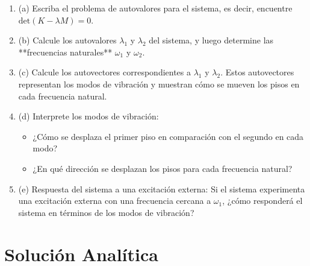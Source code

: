 \documentclass{article}
\begin{document}
\begin{enumerate}
    \item (a) Escriba el problema de autovalores para el sistema, es decir, encuentre \(\text{det}(K - \lambda M) = 0\).
    
    \item (b) Calcule los autovalores \(\lambda_1\) y \(\lambda_2\) del sistema, y luego determine las **frecuencias naturales** \(\omega_1\) y \(\omega_2\).

    \item (c) Calcule los autovectores correspondientes a \(\lambda_1\) y \(\lambda_2\). Estos autovectores representan los modos de vibración y muestran cómo se mueven los pisos en cada frecuencia natural.

    \item (d) Interprete los modos de vibración:
    \begin{itemize}
        \item ¿Cómo se desplaza el primer piso en comparación con el segundo en cada modo?
        \item ¿En qué dirección se desplazan los pisos para cada frecuencia natural?
    \end{itemize}

    \item (e) Respuesta del sistema a una excitación externa: Si el sistema experimenta una excitación externa con una frecuencia cercana a \(\omega_1\), ¿cómo responderá el sistema en términos de los modos de vibración?
\end{enumerate}

\section*{Solución Analítica}
\end{document}
